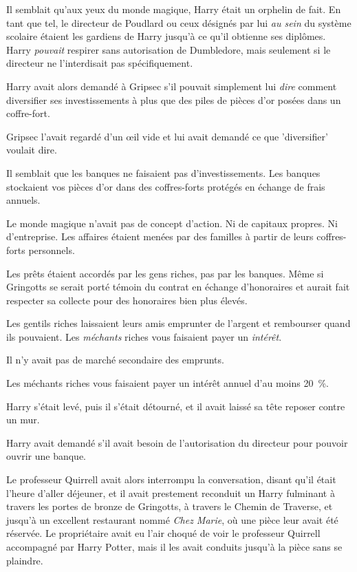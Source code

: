 Il semblait qu'aux yeux du monde magique, Harry était un orphelin de fait. En tant que tel, le directeur de Poudlard ou ceux désignés par lui \emph{au sein} du système scolaire étaient les gardiens de Harry jusqu'à ce qu'il obtienne ses diplômes. Harry \emph{pouvait} respirer sans autorisation de Dumbledore, mais seulement si le directeur ne l'interdisait pas spécifiquement.

Harry avait alors demandé à Gripsec s'il pouvait simplement lui \emph{dire} comment diversifier ses investissements à plus que des piles de pièces d'or posées dans un coffre-fort.

Gripsec l'avait regardé d'un œil vide et lui avait demandé ce que 'diversifier' voulait dire.

Il semblait que les banques ne faisaient pas d'investissements. Les banques stockaient vos pièces d'or dans des coffres-forts protégés en échange de frais annuels.

Le monde magique n'avait pas de concept d'action. Ni de capitaux propres. Ni d'entreprise. Les affaires étaient menées par des familles à partir de leurs coffres-forts personnels.

Les prêts étaient accordés par les gens riches, pas par les banques. Même si Gringotts se serait porté témoin du contrat en échange d'honoraires et aurait fait respecter sa collecte pour des honoraires bien plus élevés.

Les gentils riches laissaient leurs amis emprunter de l'argent et rembourser quand ils pouvaient. Les \emph{méchants} riches vous faisaient payer un \emph{intérêt}.

Il n'y avait pas de marché secondaire des emprunts.

Les méchants riches vous faisaient payer un intérêt annuel d'au moins 20~\%.

Harry s'était levé, puis il s'était détourné, et il avait laissé sa tête reposer contre un mur.

Harry avait demandé s'il avait besoin de l'autorisation du directeur pour pouvoir ouvrir une banque.

Le professeur Quirrell avait alors interrompu la conversation, disant qu'il était l'heure d'aller déjeuner, et il avait prestement reconduit un Harry fulminant à travers les portes de bronze de Gringotts, à travers le Chemin de Traverse, et jusqu'à un excellent restaurant nommé \emph{Chez Marie}, où une pièce leur avait été réservée. Le propriétaire avait eu l'air choqué de voir le professeur Quirrell accompagné par Harry Potter, mais il les avait conduits jusqu'à la pièce sans se plaindre.

